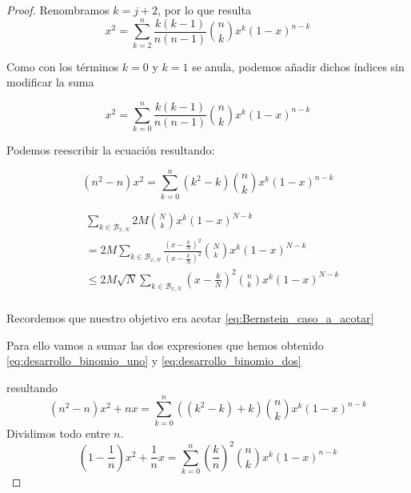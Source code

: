 \begin{proof}
    Renombramos $k= j+2$, por lo que resulta
    \begin{equation}
        x^2 = \sum_{k=2}^{n} \frac{k(k-1)}{n(n-1)} \binom{n}{k} x^{k} (1-x)^{n-k}
    \end{equation}

    Como con los términos $k=0$ y $k=1$ se anula, podemos añadir dichos índices sin modificar la suma 
    
    \begin{equation}
        x^2 = \sum_{k=0}^{n} \frac{k(k-1)}{n(n-1)} \binom{n}{k} x^{k} (1-x)^{n-k}
    \end{equation}

    Podemos reescribir la ecuación resultando: 

    \begin{equation} \label{eq:desarrollo_binomio_dos}
      (n^2 - n)  x^2 = \sum_{k=0}^{n} (k^2 - k) \binom{n}{k} x^{k} (1-x)^{n-k}
    \end{equation}
    
    


\begin{equation*}  \label{eq:Bernstein_caso_a_acotar}
    \begin{split}
    & \sum_{k \in \mathcal{B}_{x,N}} 2M \binom{N}{k} x^k (1-x) ^{N-k} \\
    & = 2M  \sum_{k \in \mathcal{B}_{x,N}}  \frac{(x- \frac{k}{N})^2}{(x- \frac{k}{N})^2} \binom{N}{k} x^k (1-x) ^{N-k} \\
    & \leq 2M \sqrt{N} \sum_{k \in \mathcal{B}_{x,N}}  (x- \frac{k}{N})^2 \binom{n}{k} x^k (1-x) ^{N-k} \\
\end{split}
\end{equation*}


Recordemos que nuestro objetivo era acotar \ref{eq:Bernstein_caso_a_acotar}

Para ello vamos a sumar las dos expresiones que hemos obtenido
 \eqref{eq:desarrollo_binomio_uno} y \eqref{eq:desarrollo_binomio_dos}

 resultando 
 \begin{equation} 
    (n^2 - n)  x^2 + nx= \sum_{k=0}^{n} ((k^2 - k)+k) \binom{n}{k} x^{k} (1-x)^{n-k}
  \end{equation}
  Dividimos todo entre $n$. 
  \begin{equation} \label{eq:binomio_tras_suma}
    (1 - \frac{1}{n})  x^2 + \frac{1}{n}x= \sum_{k=0}^{n} \left( \frac{k}{n} \right)^2 \binom{n}{k} x^{k} (1-x)^{n-k}
  \end{equation}


\end{proof}
